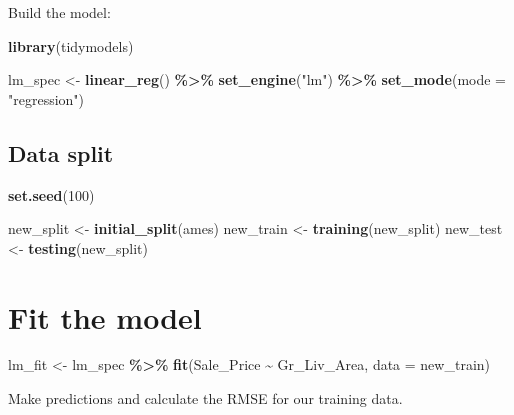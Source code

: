 \documentclass[
]{book}
\newenvironment{Shaded}{\begin{snugshade}}{\end{snugshade}}
\newcommand{\DataTypeTok}[1]{\textcolor[rgb]{0.13,0.29,0.53}{#1}}
\newcommand{\DecValTok}[1]{\textcolor[rgb]{0.00,0.00,0.81}{#1}}
\newcommand{\KeywordTok}[1]{\textcolor[rgb]{0.13,0.29,0.53}{\textbf{#1}}}
\newcommand{\NormalTok}[1]{#1}
\newcommand{\OperatorTok}[1]{\textcolor[rgb]{0.81,0.36,0.00}{\textbf{#1}}}
\newcommand{\StringTok}[1]{\textcolor[rgb]{0.31,0.60,0.02}{#1}}
\begin{document}
Build the model:

\begin{Shaded}
\begin{Highlighting}[]
\KeywordTok{library}\NormalTok{(tidymodels)}

\NormalTok{lm\_spec \textless{}{-}}
\StringTok{  }\KeywordTok{linear\_reg}\NormalTok{() }\OperatorTok{\%\textgreater{}\%}
\StringTok{  }\KeywordTok{set\_engine}\NormalTok{(}\StringTok{"lm"}\NormalTok{) }\OperatorTok{\%\textgreater{}\%}
\StringTok{  }\KeywordTok{set\_mode}\NormalTok{(}\DataTypeTok{mode =} \StringTok{"regression"}\NormalTok{)}
\end{Highlighting}
\end{Shaded}

\hypertarget{data-split}{%
\section{Data split}\label{data-split}}

\begin{Shaded}
\begin{Highlighting}[]
\KeywordTok{set.seed}\NormalTok{(}\DecValTok{100}\NormalTok{)}

\NormalTok{new\_split \textless{}{-}}\StringTok{ }\KeywordTok{initial\_split}\NormalTok{(ames)}
\NormalTok{new\_train \textless{}{-}}\StringTok{ }\KeywordTok{training}\NormalTok{(new\_split)}
\NormalTok{new\_test \textless{}{-}}\StringTok{ }\KeywordTok{testing}\NormalTok{(new\_split)}
\end{Highlighting}
\end{Shaded}

\hypertarget{fit-the-model}{%
\chapter{Fit the model}\label{fit-the-model}}

\begin{Shaded}
\begin{Highlighting}[]
\NormalTok{lm\_fit \textless{}{-}}
\StringTok{  }\NormalTok{lm\_spec }\OperatorTok{\%\textgreater{}\%}
\StringTok{  }\KeywordTok{fit}\NormalTok{(Sale\_Price }\OperatorTok{\textasciitilde{}}\StringTok{ }\NormalTok{Gr\_Liv\_Area, }\DataTypeTok{data =}\NormalTok{ new\_train)}
\end{Highlighting}
\end{Shaded}

Make predictions and calculate the RMSE for our training data.
\end{document}
